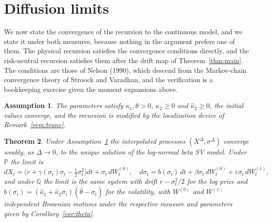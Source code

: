 \documentclass[11pt]{article}
\newtheorem{theorem}{Theorem}
\newtheorem{assumption}[theorem]{Assumption}
\theoremstyle{remark}
\newcommand{\Pm}{\mathbb{P}}
\newcommand{\Qm}{\mathbb{Q}}
\newcommand{\Dt}{\Delta}
\begin{document}
\section{Diffusion limits}\label{sec:limit}

We now state the convergence of the recursion to the continuous model, and
we state it under both measures, because nothing in the argument prefers
one of them.
The physical recursion satisfies the convergence conditions directly, and
the risk-neutral recursion satisfies them after the drift map of
Theorem~\ref{thm:main}.
The conditions are those of Nelson (1990), which descend from the
Markov-chain convergence theory of Stroock and Varadhan, and the
verification is a bookkeeping exercise given the moment expansions above.

\begin{assumption}\label{ass:limit}
The parameters satisfy $\kappa_1,\theta>0$, $\kappa_2\ge0$ and
$\hat\kappa_2\ge0$, the initial values converge, and the recursion is
modified by the localization device of Remark~\ref{rem:trunc}.
\end{assumption}

\begin{theorem}\label{thm:limit}
Under Assumption~\ref{ass:limit} the interpolated processes
$(X^{\Dt},\sigma^{\Dt})$ converge weakly, as $\Dt\to0$, to the unique
solution of the log-normal beta SV model.
Under $\Pm$ the limit is
\begin{equation}\label{eq:limitP}
dX_t=\Big(r+\gamma(\sigma_t)\sigma_t-\tfrac{1}{2}\sigma_t^2\Big)dt
+\sigma_t\,dW^{(0)}_t,
\quad
d\sigma_t=b(\sigma_t)\,dt
+\beta\sigma_t\,dW^{(0)}_t+\varepsilon\sigma_t\,dW^{(1)}_t,
\end{equation}
and under $\Qm$ the limit is the same system with drift
$r-\sigma_t^2/2$ for the log price and
$\hat b(\sigma_t)=(\hat\kappa_1+\hat\kappa_2\sigma_t)
(\hat\theta-\sigma_t)$ for the volatility, with
$W^{(0)}$ and $W^{(1)}$ independent Brownian motions under the respective
measure and parameters given by Corollary~\ref{cor:theta}.
\end{theorem}
\end{document}
